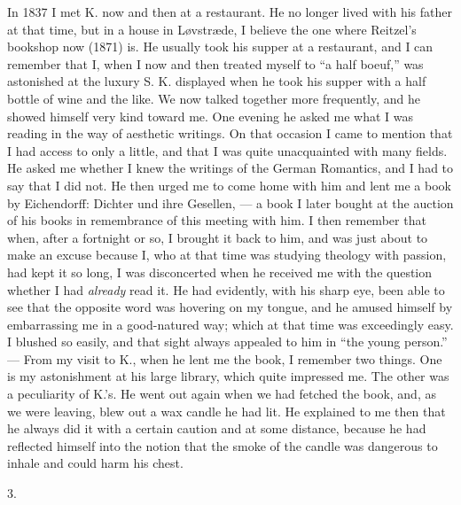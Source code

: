 \documentclass[12pt,a4paper,openany]{book}
\newcommand{\secnum}[1]{\par\begin{center}#1\end{center}\par\nobreak}
\newcommand{\opage}[1]{\marginnote{\footnotesize\textit{[#1]}}}
\begin{document}
\opage{339}In 1837 I met K. now and then at a restaurant.
He no longer lived with his father at that time, but in a
house in Løvstræde, I believe the one where Reitzel's
bookshop now (1871) is. He usually took his supper at a restaurant,
and I can remember that I, when I now and
then treated myself to ``a half boeuf,'' was astonished
at the luxury S. K. displayed when he took his
supper with a half bottle of wine and the like. We now talked
together more frequently, and he showed himself very kind toward
me. One evening he asked me what I was reading in the way of
aesthetic writings. On that occasion I came to
mention that I had access to only a little, and that I
was quite unacquainted with many fields. He asked
me whether I knew the writings of the German Romantics,
and I had to say that I did not. He then urged me
to come home with him and lent me a book by
Eichendorff: Dichter und ihre Gesellen, --- a book I
later bought at the auction of his books in remembrance
of this meeting with him. I then remember that when,
after a fortnight or so, I brought it back to him, and
was just about to make an excuse because I, who at that time
was studying theology with passion, had kept it
so long, I was disconcerted when he received me
with the question whether I had \emph{already} read it.
He had evidently, with his sharp eye, been able to see that
the opposite word was hovering on my tongue, and he
amused himself by embarrassing me in a good-natured way;
which at that time was exceedingly easy. I
blushed so easily, and that sight always appealed to him
in ``the young person.'' --- From my visit to K., when
he lent me the book, I remember two things. One is
my astonishment at his large library, which quite
impressed me. The other was a peculiarity of K.'s. He
went out again when we had fetched the book, and, as
we were leaving, blew out a wax candle he had lit. He
\opage{340}explained to me then that he always did it with a certain
caution and at some distance, because he had
reflected himself into the notion that the smoke of the candle
was dangerous to inhale and could harm his
chest.

\secnum{3.}
\end{document}
